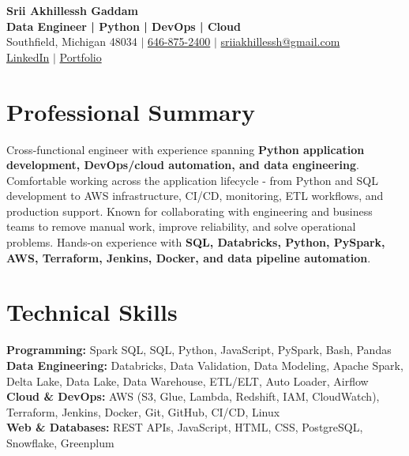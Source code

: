 \documentclass[letterpaper,10pt]{article}
\begin{document}
\fontsize{9.35pt}{10.45pt}\selectfont

\begin{center}
    {\LARGE \textbf{Srii Akhillessh Gaddam}} \\[-1pt]
    \textbf{Data Engineer | Python | DevOps | Cloud} \\[2pt]
    Southfield, Michigan 48034 $|$
    \href{tel:6468752400}{646-875-2400} $|$
    \href{mailto:sriiakhillessh@gmail.com}{sriiakhillessh@gmail.com} \\[1pt]
    \href{https://www.linkedin.com/in/srii-akhiilessh-gaddam-b48668191/}{LinkedIn} $|$
    \href{https://sriiakhillesshg.github.io/portfolio/}{Portfolio}
\end{center}
\vspace{-8pt}

\section{Professional Summary}
\small{Cross-functional engineer with experience spanning \textbf{Python application development, DevOps/cloud automation, and data engineering}. Comfortable working across the application lifecycle - from Python and SQL development to AWS infrastructure, CI/CD, monitoring, ETL workflows, and production support. Known for collaborating with engineering and business teams to remove manual work, improve reliability, and solve operational problems. Hands-on experience with \textbf{SQL, Databricks, Python, PySpark, AWS, Terraform, Jenkins, Docker, and data pipeline automation}.}

\section{Technical Skills}
\small{
\textbf{Programming:} Spark SQL, SQL, Python, JavaScript, PySpark, Bash, Pandas \\
\textbf{Data Engineering:} Databricks, Data Validation, Data Modeling, Apache Spark, Delta Lake, Data Lake, Data Warehouse, ETL/ELT, Auto Loader, Airflow \\
\textbf{Cloud \& DevOps:} AWS (S3, Glue, Lambda, Redshift, IAM, CloudWatch), Terraform, Jenkins, Docker, Git, GitHub, CI/CD, Linux \\
\textbf{Web \& Databases:} REST APIs, JavaScript, HTML, CSS, PostgreSQL, Snowflake, Greenplum
}
\end{document}
